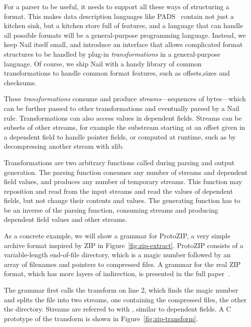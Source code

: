For a parser to be useful, it needs to support all these ways of structuring a format. This makes data description languages like
PADS~\cite{Fisher:2005:PDL:1064978.1065046} contain not just a kitchen sink, but a kitchen store
full of features, and a language that can handle all possible formats will be a general-purpose
programming language.  Instead, we keep Nail itself small, and introduce an
interface that allows complicated format structures to be handled by  plug-in \emph{transformations} 
in a general-purpose
language. Of course, we ship Nail with a handy library of common transformations to handle common
format features, such as offsets,sizes and checksums.

These \emph{transformations} consume and produce
\emph{streams}---sequences of bytes---which can be further passed to other transformations and
eventually parsed by a Nail rule. Transformations can also access values in dependent fields. 
Streams can be subsets of other streams, for example the substream starting at an
offset given in a dependent field to handle pointer fields, or computed at runtime,
such as by decompressing another stream with zlib.


Transformations are two arbitrary functions called during parsing and output generation.
The parsing function consumes any number of streams and dependent field values,
and produces any number of temporary streams. This function may reposition and read from the
input streams and read the values of dependent fields, but not change their contents and values. 
The generating function has to be an inverse of the parsing function, consuming streams and
producing dependent field values and other streams.



As a concrete example, we will show a grammar for ProtoZIP, a very simple archive format inspired by ZIP in
Figure~\ref{fig:zip-extract}. ProtoZIP consists of a variable-length end-of-file directory, which
is a magic number followed by an array of filenames and pointers to compressed files. A grammar for the real ZIP format, which
has more layers of indirection, is presented in the full paper~\cite{bangert:nail}.

The grammar first calls the  transform on line 2, which finds the magic number and splits the file into
two streams, one containing the compressed files, the other the directory.  Streams are referred to
with , similar to dependent fields. A C prototype of the  transform is
shown in Figure~\ref{fig:zip-transform}. 

